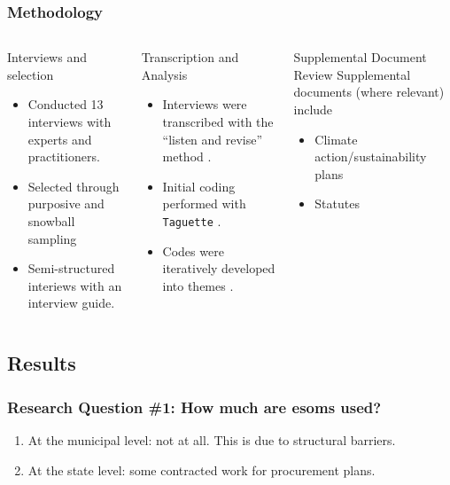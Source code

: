 \begin{frame}
    \frametitle{Methodology}


    \begin{columns}
        \column[t]{3.33cm}
        \begin{block}{Interviews and selection}
            \begin{itemize}[<+->]
                \item Conducted 13 interviews with experts and practitioners.
                \item Selected through purposive and snowball sampling
                \item Semi-structured interiews with an interview guide.
            \end{itemize}
        \end{block}
        \column[t]{3.33cm}
        \begin{block}{Transcription and Analysis}
            \begin{itemize}[<+->]
                \item Interviews were transcribed with the ``listen and revise''
                method \cite{battaglia_listen_2024}.
                \item Initial coding performed with \texttt{Taguette}
                \cite{rampin_taguette_2021}.
                \item Codes were iteratively developed into themes
                \cite{braun_using_2006}.
            \end{itemize}
        \end{block}
        \column[t]{3.33cm}
        \begin{block}{Supplemental Document Review}
            Supplemental documents (where relevant) include
            \begin{itemize}[<+->]
                \item Climate action/sustainability plans
                \item Statutes
            \end{itemize}
        \end{block}
    \end{columns}
\end{frame}

\subsection{Results}
\begin{frame}
    \frametitle{Research Question \#1: How much are \glspl{esom} used?}

    \begin{enumerate}
        \item At the municipal level: not at all. This is due to structural barriers.
        \item At the state level: some contracted work for procurement plans.
    \end{enumerate}
    
\end{frame}

